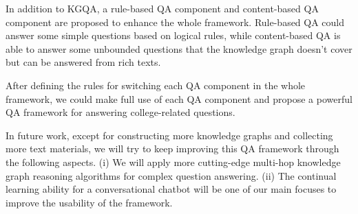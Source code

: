 \documentclass[11pt]{article}
\begin{document}
In addition to KGQA, a rule-based QA component and content-based QA component are proposed to enhance the whole framework. Rule-based QA could answer some simple questions based on logical rules, while content-based QA is able to answer some unbounded questions that the knowledge graph doesn't cover but can be answered from rich texts.

After defining the rules for switching each QA component in the whole framework, we could make full use of each QA component and propose a powerful QA framework for answering college-related questions.

In future work, except for constructing more knowledge graphs and collecting more text materials, we will try to keep improving this QA framework through the following aspects. (i) We will apply more cutting-edge multi-hop knowledge graph reasoning algorithms for complex question answering. (ii) The continual learning ability for a conversational chatbot will be one of our main focuses to improve the usability of the framework.
\end{document}
